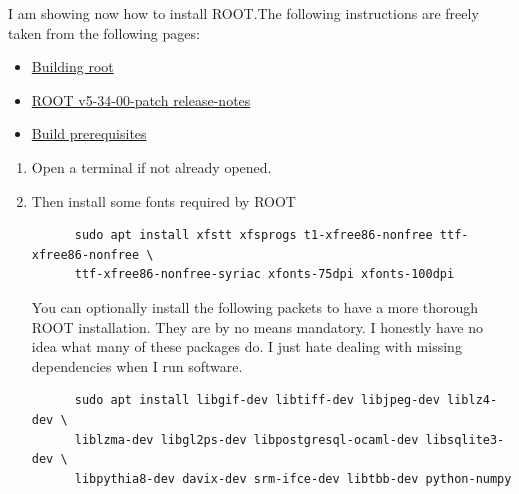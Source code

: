 I am showing now how to install ROOT.\@ The following instructions are
freely taken from the following pages:
\begin{itemize}
\item \href{https://root.cern.ch/building-root}{Building root}
\item
  \href{https://d35c7d8c.web.cern.ch/root-version-v5-34-00-patch-release-notes}%
  {ROOT v5-34-00-patch release-notes}
\item \href{https://root.cern.ch/build-prerequisites}{Build
    prerequisites}
\end{itemize}

\begin{enumerate}[resume]
\item Open a terminal if not already opened.
\item\label{root-1} Then install some fonts required by ROOT%
\begin{lstlisting}
      sudo apt install xfstt xfsprogs t1-xfree86-nonfree ttf-xfree86-nonfree \
      ttf-xfree86-nonfree-syriac xfonts-75dpi xfonts-100dpi
\end{lstlisting}
  You can optionally install the following packets to have a more
  thorough ROOT installation. They are by no means mandatory. I
  honestly have no idea what many of these packages do. I just hate
  dealing with missing dependencies when I run software.
\begin{lstlisting}
      sudo apt install libgif-dev libtiff-dev libjpeg-dev liblz4-dev \
      liblzma-dev libgl2ps-dev libpostgresql-ocaml-dev libsqlite3-dev \
      libpythia8-dev davix-dev srm-ifce-dev libtbb-dev python-numpy
\end{lstlisting}
  

\end{enumerate}
